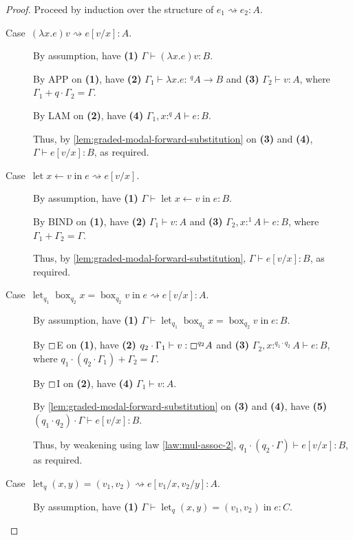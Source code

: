 \documentclass[acmsmall,screen,nonacm]{acmart}
\DeclareMathOperator{\llet}{\text{let}}
\DeclareMathOperator{\lin}{\text{in}}
\DeclareMathOperator{\bbox}{\text{box}}
\newcommand{\tee}{\vdash}
\DeclareMathOperator{\red}{\rightsquigarrow}
\begin{document}
\begin{proof}
  Proceed by induction over the structure of $e_1 \red e_2 : A$. 
  \begin{description}
    \item[\mbox{Case $(\lambda x.e) v \red e[v/x] : A$}.]
    By assumption, have \textbf{(1)} $\Gamma \tee (\lambda x.e) v : B$.

    By APP on \textbf{(1)}, have \textbf{(2)} $\Gamma_1 \tee \lambda x.e : \,^q A \rightarrow B$ and \textbf{(3)} $\Gamma_2 \tee v : A$, where $\Gamma_1 + q \cdot \Gamma_2 = \Gamma$.
    
    By LAM on \textbf{(2)}, have \textbf{(4)} $\Gamma_1, x :^q A \tee e : B$.

    Thus, by \ref{lem:graded-modal-forward-substitution} on \textbf{(3)} and \textbf{(4)}, $\Gamma \tee e[v/x] : B$, as required.
    \\
    \item[\mbox{Case $\llet x \leftarrow v \lin e \red e[v/x]$}.]
    By assumption, have \textbf{(1)} $\Gamma \tee \llet x \leftarrow v \lin e : B$.

    By BIND on \textbf{(1)}, have \textbf{(2)} $\Gamma_1 \tee v : A$ and \textbf{(3)} $\Gamma_2, x :^1 A \tee e : B$, where $\Gamma_1 + \Gamma_2 = \Gamma$.

    Thus, by \ref{lem:graded-modal-forward-substitution}, $\Gamma \tee e[v/x] : B$, as required.
    \\
    \item[\mbox{Case $\llet_{q_1} \bbox_{q_2} x = \bbox_{q_2} v \lin e \red e[v/x] : A$}.] 
    By assumption, have \textbf{(1)} $\Gamma \tee \llet_{q_1} \bbox_{q_2} x = \bbox_{q_2} v \lin e : B$.

    By $\boxempty$E on \textbf{(1)}, have \textbf{(2)} $q_2 \cdot \Gamma_1 \tee v : \boxempty^{q_2} A$ and \textbf{(3)} $\Gamma_2, x :^{q_1 \cdot q_2} A \tee e : B$, where $q_1 \cdot (q_2 \cdot \Gamma_1) + \Gamma_2 = \Gamma$.

    By $\boxempty$I on \textbf{(2)}, have \textbf{(4)} $\Gamma_1 \tee v : A$.

    By \ref{lem:graded-modal-forward-substitution} on \textbf{(3)} and \textbf{(4)}, have \textbf{(5)} $(q_1 \cdot q_2) \cdot \Gamma \tee e[v/x] : B$.
    
    Thus, by weakening using law \ref{law:mul-assoc-2}, $q_1 \cdot (q_2 \cdot \Gamma) \tee e[v/x] : B$, as required.
    \\
    \item[\mbox{Case $\llet_q (x, y) = (v_1, v_2) \red e[v_1/x, v_2/y] : A$}.]
    By assumption, have \textbf{(1)} $\Gamma \tee \llet_q (x, y) = (v_1, v_2) \lin e : C$.


\end{description}
\end{proof}
\end{document}

